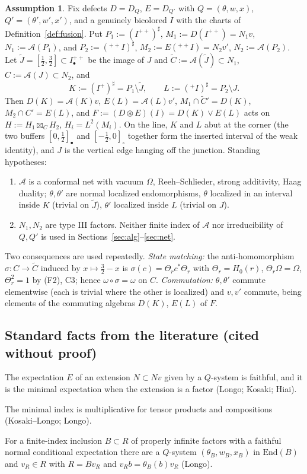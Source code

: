 \documentclass[11pt]{article}
\theoremstyle{definition}
\newtheorem{assumption}[theorem]{Assumption}
\theoremstyle{remark}
\newcommand{\cA}{\mathcal A}
\newcommand{\Om}{\Omega}
\newcommand{\fus}{\boxtimes}
\newcommand{\cfus}{\circledast}
\begin{document}
\begin{assumption}\label{ass:S}
Fix defects $D=D_Q$, $E=D_{Q'}$ with $Q=(\theta,w,x)$, $Q'=(\theta',w',x')$, and a genuinely bicolored $I$ with the charts of Definition~\ref{def:fusion}. Put $P_1:=(I^{++})^\sharp$, $M_1:=D(I^{++})=N_1v$, $N_1:=\cA(P_1)$, and $P_2:=({}^{++}I)^\sharp$, $M_2:=E({}^{++}I)=N_2v'$, $N_2:=\cA(P_2)$. Let $\tilde J=[\tfrac12,\tfrac32]\subset I^{++}_\bullet$ be the image of $J$ and $\tilde C:=\cA(\tilde J)\subset N_1$, $C:=\cA(J)\subset N_2$, and
\[
K:=(I^+)^\sharp=P_1\setminus\tilde J,\qquad L:=({}^+I)^\sharp=P_2\setminus J .
\]
Then $D(K)=\cA(K)v$, $E(L)=\cA(L)v'$, $M_1\cap\tilde C'=D(K)$, $M_2\cap C'=E(L)$, and $F:=(D\cfus E)(I)=D(K)\vee E(L)$ acts on $H:=H_1\fus_CH_2$, $H_i=L^2(M_i)$. On the line, $K$ and $L$ abut at the corner (the two buffers $[0,\tfrac12]_\bullet$ and $[-\tfrac12,0]_\circ$ together form the inserted interval of the weak identity), and $J$ is the vertical edge hanging off the junction. Standing hypotheses:
\begin{enumerate}[label=\textbf{S\arabic*}.,leftmargin=2.2em]
\item $\cA$ is a conformal net with vacuum $\Om$, Reeh--Schlieder, strong additivity, Haag duality; $\theta,\theta'$ are normal localized endomorphisms, $\theta$ localized in an interval inside $K$ (trivial on $\tilde J$), $\theta'$ localized inside $L$ (trivial on $J$).
\item $N_1,N_2$ are type III factors. Neither finite index of $\cA$ nor irreducibility of $Q,Q'$ is used in Sections~\ref{sec:alg}--\ref{sec:net}.
\end{enumerate}
\end{assumption}

Two consequences are used repeatedly. \emph{State matching:} the anti-homomorphism $\sigma\colon C\to\tilde C$ induced by $x\mapsto\tfrac32-x$ is $\sigma(c)=\Theta_rc^*\Theta_r$ with $\Theta_r=H_0(r)$, $\Theta_r\Om=\Om$, $\Theta_r^2=1$ by (F2), C3; hence $\omega\circ\sigma=\omega$ on $C$. \emph{Commutation:} $\theta,\theta'$ commute elementwise (each is trivial where the other is localized) and $v,v'$ commute, being elements of the commuting algebras $D(K)$, $E(L)$ of $F$.

\subsection{Standard facts from the literature (cited without proof)}\label{sec:facts}
\begin{description}[leftmargin=2em,nosep]
\item[L1] The expectation $E$ of an extension $N\subset N v$ given by a $Q$-system is faithful, and it is the minimal expectation when the extension is a factor (Longo; Kosaki; Hiai).
\item[L2] The minimal index is multiplicative for tensor products and compositions (Kosaki--Longo; Longo).
\item[L3] For a finite-index inclusion $B\subset R$ of properly infinite factors with a faithful normal conditional expectation there are a $Q$-system $(\theta_B,w_B,x_B)$ in $\mathrm{End}(B)$ and $v_R\in R$ with $R=Bv_R$ and $v_Rb=\theta_B(b)v_R$ (Longo).
\end{description}
\end{document}
